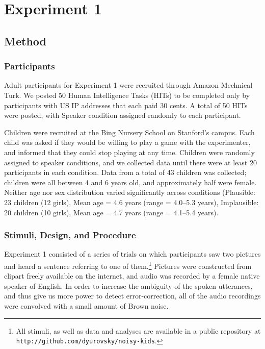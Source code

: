 \documentclass[man,floatsintext]{apa6}
\begin{document}
\section{Experiment 1}

\subsection{Method}
\subsubsection{Participants}

Adult participants for Experiment 1 were recruited through Amazon Mechnical Turk. We posted 50 Human Intelligence Tasks (HITs) to be completed only by participants with US IP addresses that each paid 30 cents. A total of 50 HITs were posted, with Speaker condition assigned randomly to each participant.

Children were recruited at the Bing Nursery School on Stanford's campus. Each child was asked if they would be willing to play a game with the experimenter, and informed that they could stop playing at any time. Children were randomly assigned to speaker conditions, and we collected data until there were at least 20 participants in each condition. Data from a total of 43 children was collected; children were all between 4 and 6 years old, and approximately half were female. Neither age nor sex distribution varied significantly across conditions (Plausible: 23 children (12 girls), Mean age = 4.6 years (range = 4.0--5.3 years), Implausible: 20 children (10 girls), Mean age = 4.7 years (range = 4.1--5.4 years).

\subsubsection{Stimuli, Design, and Procedure}

Experiment 1 consisted of a series of trials on which participants saw two pictures and heard a sentence referring to one of them.\footnote{All stimuli, as well as data and analyses are available in a public repository at \small{\tt{http://github.com/dyurovsky/noisy-kids}}.} Pictures were constructed from clipart freely available on the internet, and audio was recorded by a female native speaker of English. In order to increase the ambiguity of the spoken utterances, and thus give us more power to detect error-correction, all of the audio recordings were convolved with a small amount of Brown noise.
\end{document}
